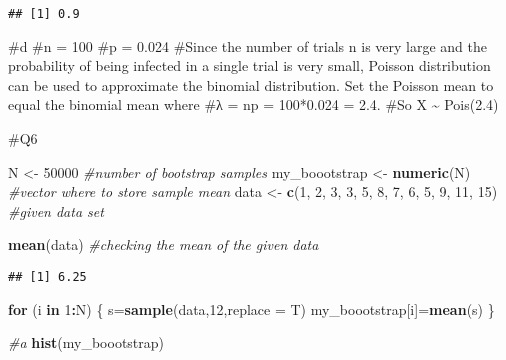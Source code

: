\documentclass[
]{article}
\newenvironment{Shaded}{\begin{snugshade}}{\end{snugshade}}
\newcommand{\AttributeTok}[1]{\textcolor[rgb]{0.13,0.29,0.53}{#1}}
\newcommand{\CommentTok}[1]{\textcolor[rgb]{0.56,0.35,0.01}{\textit{#1}}}
\newcommand{\ControlFlowTok}[1]{\textcolor[rgb]{0.13,0.29,0.53}{\textbf{#1}}}
\newcommand{\DecValTok}[1]{\textcolor[rgb]{0.00,0.00,0.81}{#1}}
\newcommand{\FunctionTok}[1]{\textcolor[rgb]{0.13,0.29,0.53}{\textbf{#1}}}
\newcommand{\NormalTok}[1]{#1}
\newcommand{\OtherTok}[1]{\textcolor[rgb]{0.56,0.35,0.01}{#1}}
\newcommand{\SpecialCharTok}[1]{\textcolor[rgb]{0.81,0.36,0.00}{\textbf{#1}}}
\begin{document}
\begin{verbatim}
## [1] 0.9
\end{verbatim}

\#d \#n = 100 \#p = 0.024 \#Since the number of trials n is very large
and the probability of being infected in a single trial is very small,
Poisson distribution can be used to approximate the binomial
distribution. Set the Poisson mean to equal the binomial mean where \#λ
= np = 100*0.024 = 2.4. \#So X \textasciitilde{} Pois(2.4)

\#Q6

\begin{Shaded}
\begin{Highlighting}[]
\NormalTok{N }\OtherTok{\textless{}{-}} \DecValTok{50000} \CommentTok{\#number of bootstrap samples}
\NormalTok{my\_boootstrap }\OtherTok{\textless{}{-}} \FunctionTok{numeric}\NormalTok{(N) }\CommentTok{\#vector where to store sample mean}
\NormalTok{data }\OtherTok{\textless{}{-}} \FunctionTok{c}\NormalTok{(}\DecValTok{1}\NormalTok{, }\DecValTok{2}\NormalTok{, }\DecValTok{3}\NormalTok{, }\DecValTok{3}\NormalTok{, }\DecValTok{5}\NormalTok{, }\DecValTok{8}\NormalTok{, }\DecValTok{7}\NormalTok{, }\DecValTok{6}\NormalTok{, }\DecValTok{5}\NormalTok{, }\DecValTok{9}\NormalTok{, }\DecValTok{11}\NormalTok{, }\DecValTok{15}\NormalTok{) }\CommentTok{\#given data set}

\FunctionTok{mean}\NormalTok{(data) }\CommentTok{\#checking the mean of the given data}
\end{Highlighting}
\end{Shaded}

\begin{verbatim}
## [1] 6.25
\end{verbatim}

\begin{Shaded}
\begin{Highlighting}[]
\ControlFlowTok{for}\NormalTok{ (i }\ControlFlowTok{in} \DecValTok{1}\SpecialCharTok{:}\NormalTok{N) \{}
\NormalTok{  s}\OtherTok{=}\FunctionTok{sample}\NormalTok{(data,}\DecValTok{12}\NormalTok{,}\AttributeTok{replace =}\NormalTok{ T)}
\NormalTok{  my\_boootstrap[i]}\OtherTok{=}\FunctionTok{mean}\NormalTok{(s)}
\NormalTok{\}}
\end{Highlighting}
\end{Shaded}

\begin{Shaded}
\begin{Highlighting}[]
\CommentTok{\#a}
\FunctionTok{hist}\NormalTok{(my\_boootstrap)}
\end{Highlighting}
\end{Shaded}
\end{document}
